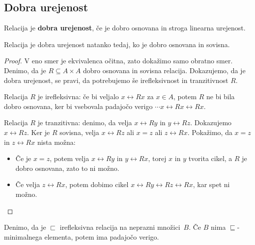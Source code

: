 \subsection{Dobra urejenost}

\begin{definicija}
  Relacija je \textbf{dobra urejenost}, če je dobro osnovana in stroga linearna urejenost.
\end{definicija}

\begin{izrek}
  Relacija je dobra urejenost natanko tedaj, ko je dobro osnovana in sovisna.
\end{izrek}

\begin{proof}
  V eno smer je ekvivalenca očitna, zato dokažimo samo obratno smer. Denimo, da je
  $R \subseteq A \times A$ dobro osnovana in sovisna relacija. Dokazujemo, da je dobra urejenost, se pravi,
  da potrebujemo še irefleksivnost in tranzitivnost $R$.

  Relacija $R$ je irefleksivna: če bi veljalo $x \rel{R} x$ za $x \in A$, potem $R$ ne bi bila dobro
  osnovana, ker bi vsebovala padajočo verigo $\cdots x \rel{R} x \rel{R} x$.

  Relacija $R$ je tranzitivna: denimo, da velja $x \rel{R} y$ in $y \rel{R} z$. Dokazujemo $x \rel{R} z$. Ker je $R$
  sovisna, velja $x \rel{R} z$ ali $x = z$ ali $z \rel{R} x$. Pokažimo, da $x = z$ in $z \rel{R} x$ nista
  možna:
  \begin{itemize}
  \item Če je $x = z$, potem velja $x \rel{R} y$ in $y \rel{R} x$, torej $x$ in $y$ tvorita cikel, a
    $R$ je dobro osnovana, zato to ni možno.
  \item Če velja $z \rel{R} x$, potem dobimo cikel $x \rel{R} y \rel{R} z \rel{R} x$, kar spet ni možno.
  \end{itemize}
\end{proof}

\begin{lema}
  \label{lem:nepr-min-veriga}%
  Denimo, da je $\sqsubset$ irefleksivna relacija na neprazni množici~$B$. Če $B$ nima
  $\sqsubseteq$-minimalnega elementa, potem ima padajočo verigo.
\end{lema}

